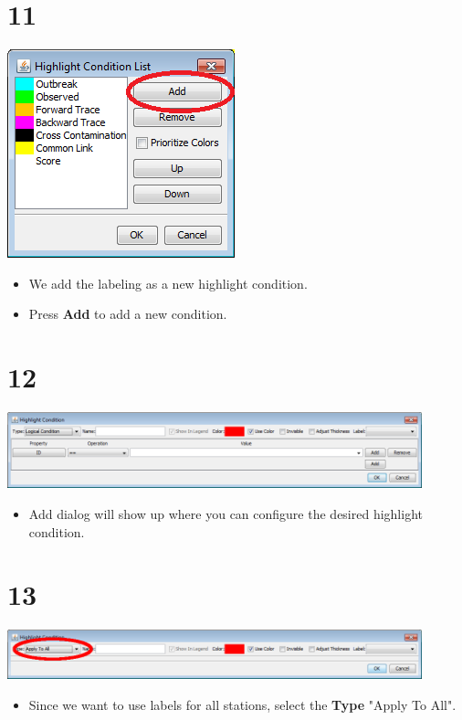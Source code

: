 \documentclass{beamer}
\begin{document}
\section{11}
\begin{frame}
	\begin{center}
  		\includegraphics[height=0.6\textheight]{11.png}
	\end{center}
	\begin{itemize}
		\item We add the labeling as a new highlight condition.
		\item Press \textbf{Add} to add a new condition.
	\end{itemize}
\end{frame}

\section{12}
\begin{frame}
	\begin{center}
  		\includegraphics[width=0.9\textwidth]{12.png}
	\end{center}
	\begin{itemize}
		\item Add dialog will show up where you can configure the desired highlight condition.		
	\end{itemize}
\end{frame}

\section{13}
\begin{frame}
	\begin{center}
  		\includegraphics[width=0.9\textwidth]{13.png}
	\end{center}
	\begin{itemize}
		\item Since we want to use labels for all stations, select the \textbf{Type} "Apply To All".
	\end{itemize}
\end{frame}
\end{document}
